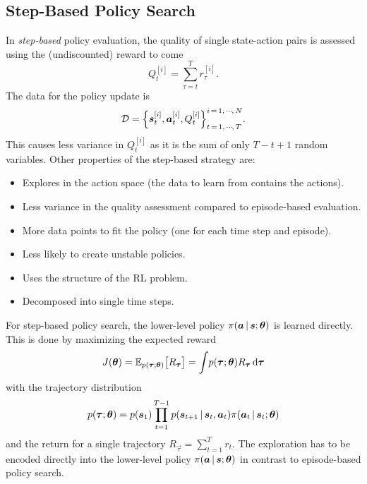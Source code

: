 		\subsection{Step-Based Policy Search}
			In \emph{step-based} policy evaluation, the quality of single state-action pairs is assessed using the (undiscounted) reward to come
			\begin{equation}
			Q_t^{[i]} = \sum_{\tau = t}^{T} r_\tau^{[i]}.  \label{eq:policyGradientRewardToCome}
			\end{equation}
			The data for the policy update is
			\begin{equation*}
			\mathcal{D} = \Big\{ \bm{s}_t^{[i]}, \bm{a}_t^{[i]}, Q_t^{[i]} \Big\}_{t \,=\, 1,\,\cdots\!,\,T}^{i \,=\, 1,\,\cdots\!,\,N}.
			\end{equation*}
			This causes less variance in \( Q_t^{[i]} \) as it is the sum of only \( T - t + 1 \) random variables. Other properties of the step-based strategy are:
			\begin{itemize}
				\item Explores in the action space (the data to learn from contains the actions).
				\item Less variance in the quality assessment compared to episode-based evaluation.
				\item More data points to fit the policy (one for each time step and episode).
				\item Less likely to create unstable policies.
				\item Uses the structure of the RL problem.
				\item Decomposed into single time steps.
			\end{itemize}

			For step-based policy search, the lower-level policy \( \pi(\bm{a} \,\vert\, \bm{s}; \bm{\theta}) \) is learned directly. This is done by maximizing the expected reward
			\begin{equation}
				J(\bm{\theta})
					= \mathbb{E}_{p(\bm{\tau}; \bm{\theta})}\big[ R_{\bm{\tau}} \big]
					= \int\! p(\bm{\tau}; \bm{\theta}) R_{\bm{\tau}} \dd{\bm{\tau}}  \label{eq:policyGradientStepBasedObjective}
			\end{equation}
			with the trajectory distribution
			\begin{equation}
				p(\bm{\tau}; \bm{\theta}) = p(\bm{s}_1) \prod_{t = 1}^{T - 1} p(\bm{s}_{t + 1} \,\vert\, \bm{s}_t, \bm{a}_t) \pi(\bm{a}_t \,\vert\, \bm{s}_t; \bm{\theta})  \label{eq:policyGradientTrajectoryDistribution}
			\end{equation}
			and the return for a single trajectory \( R_{\vec{\tau}} = \sum_{t = 1}^{T} r_t \). The exploration has to be encoded directly into the lower-level policy \( \pi(\bm{a} \,\vert\, \bm{s}; \bm{\theta}) \) in contrast to episode-based policy search.

